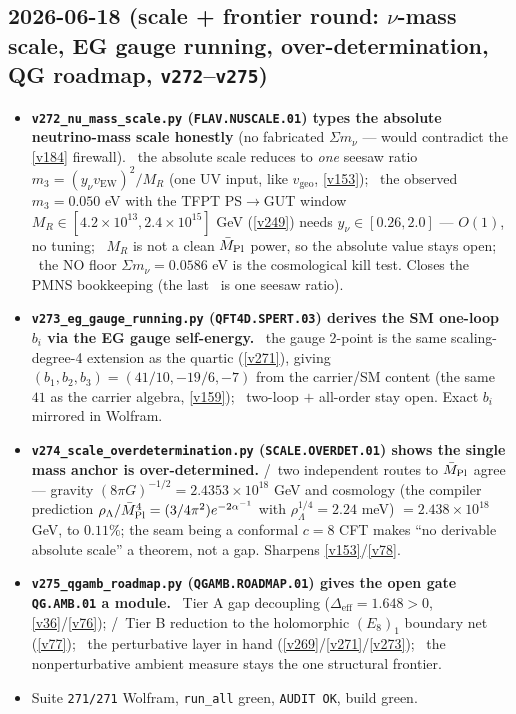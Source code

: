 \subsection*{2026-06-18 (scale + frontier round: $\nu$-mass scale, EG gauge running, over-determination, QG roadmap, \texttt{v272}--\texttt{v275})}
\begin{itemize}
\item \textbf{\texttt{v272\_nu\_mass\_scale.py} (\texttt{FLAV.NUSCALE.01}) types the absolute neutrino-mass scale
  honestly} (no fabricated $\Sigma m_\nu$ --- would contradict the \vref{v184} firewall). \mE\ the absolute
  scale reduces to \emph{one} seesaw ratio $m_3=(y_\nu v_{\mathrm{EW}})^2/M_R$ (one UV input, like $v_{\mathrm{geo}}$,
  \vref{v153}); \mC\ the observed $m_3{=}0.050$ eV with the TFPT PS$\to$GUT window $M_R\in[4.2{\times}10^{13},
  2.4{\times}10^{15}]$ GeV (\vref{v249}) needs $y_\nu\in[0.26,2.0]$ --- $O(1)$, no tuning; \mO\ $M_R$ is not a clean
  $\bar M_{\mathrm{Pl}}$ power, so the absolute value stays open; \mX\ the NO floor $\Sigma m_\nu{=}0.0586$ eV is the cosmological
  kill test. Closes the PMNS bookkeeping (the last \mO\ is one seesaw ratio).
\item \textbf{\texttt{v273\_eg\_gauge\_running.py} (\texttt{QFT4D.SPERT.03}) derives the SM one-loop $b_i$ via the EG
  gauge self-energy.} \mE\ the gauge 2-point is the same scaling-degree-4 extension as the quartic (\vref{v271}),
  giving $(b_1,b_2,b_3)=(41/10,-19/6,-7)$ from the carrier/SM content (the same $41$ as the carrier algebra,
  \vref{v159}); \mO\ two-loop $+$ all-order stay open. Exact $b_i$ mirrored in Wolfram.
\item \textbf{\texttt{v274\_scale\_overdetermination.py} (\texttt{SCALE.OVERDET.01}) shows the single mass anchor is
  over-determined.} \mE/\mC\ two independent routes to $\bar M_{\mathrm{Pl}}$ agree --- gravity $(8\pi G)^{-1/2}=2.4353{\times}10^{18}$
  GeV and cosmology (the compiler prediction $\rho_\Lambda/\bar M_{\mathrm{Pl}}^4=(3/4\pi^2)e^{-2\alpha^{-1}}$ with
  $\rho_\Lambda^{1/4}=2.24$ meV) $=2.438{\times}10^{18}$ GeV, to $0.11\%$; the seam being a conformal $c{=}8$ CFT
  makes ``no derivable absolute scale'' a theorem, not a gap. Sharpens \vref{v153}/\vref{v78}.
\item \textbf{\texttt{v275\_qgamb\_roadmap.py} (\texttt{QGAMB.ROADMAP.01}) gives the open gate \texttt{QG.AMB.01} a
  module.} \mE\ Tier A gap decoupling ($\Delta_{\mathrm{eff}}=1.648>0$, \vref{v36}/\vref{v76}); \mE/\mC\ Tier B
  reduction to the holomorphic $(E_8)_1$ boundary net (\vref{v77}); \mC\ the perturbative layer in hand
  (\vref{v269}/\vref{v271}/\vref{v273}); \mO\ the nonperturbative ambient measure stays the one structural frontier.
\item Suite \texttt{271/271} Wolfram, \texttt{run\_all} green, \texttt{AUDIT OK}, build green.
\end{itemize}

